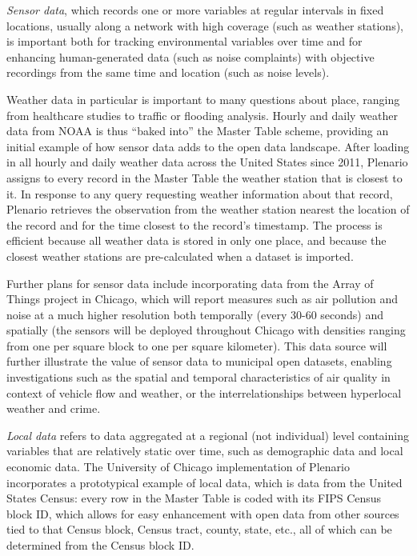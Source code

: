 \documentclass[11pt]{article}
\begin{document}
\textit{Sensor data}, which records one or more variables at regular intervals in fixed locations, usually along a network with high coverage (such as weather stations), is important both for tracking environmental variables over time and for enhancing human-generated data (such as noise complaints) with objective recordings from the same time and location (such as noise levels). 

Weather data in particular is important to many questions about place, ranging from healthcare studies to traffic or flooding analysis. Hourly and daily weather data from NOAA is thus ``baked into'' the Master Table scheme, providing an initial example of how sensor data adds to the open data landscape. After loading in all hourly and daily weather data across the United States since 2011, Plenario assigns to every record in the Master Table the weather station that is closest to it. In response to any query requesting weather information about that record, Plenario retrieves the observation from the weather station nearest the location of the record and for the time closest to the record's timestamp. The process is efficient because all weather data is stored in only one place, and because the closest weather stations are pre-calculated when a dataset is imported. 

Further plans for sensor data include incorporating data from the Array of Things \cite{moser_2015} project in Chicago, which will report measures such as air pollution and noise at a much higher resolution both temporally (every 30-60 seconds) and spatially (the sensors will be deployed throughout Chicago with densities ranging from one per square block to one per square kilometer). This data source will further illustrate the value of sensor data to municipal open datasets, enabling investigations such as the spatial and temporal characteristics of air quality in context of vehicle flow and weather, or the interrelationships between hyperlocal weather and crime. 

\textit{Local data} refers to data aggregated at a regional (not individual) level containing variables that are relatively static over time, such as demographic data and local economic data. The University of Chicago implementation of Plenario incorporates a prototypical example of local data, which is data from the United States Census: every row in the Master Table is coded with its FIPS Census block ID, which allows for easy enhancement with open data from other sources tied to that Census block, Census tract, county, state, etc., all of which can be determined from the Census block ID. 
\end{document}

